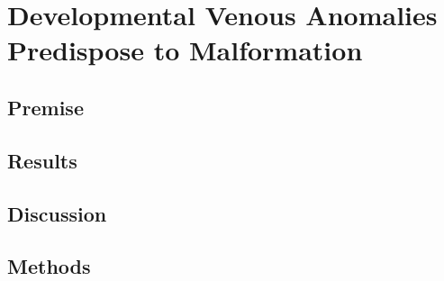 \chapter{Developmental Venous Anomalies Predispose to Malformation}

\section{Premise}
\section{Results}
\section{Discussion}
\section{Methods}